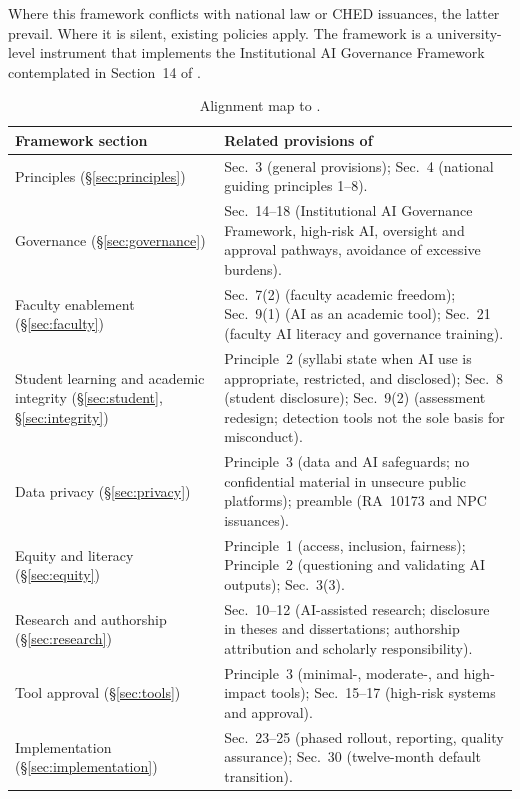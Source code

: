 Where this framework conflicts with national law or CHED issuances, the latter prevail. Where it is silent, existing \vsu{} policies apply. The framework is a university-level instrument that implements the Institutional AI Governance Framework contemplated in Section~14 of \cmo{}.

\begin{table}[ht]
\centering
\caption{Alignment map to \cmo{}.}
\label{tab:alignment}
\small
\begin{tabular}{@{}p{4.2cm}p{10cm}@{}}
\toprule
Framework section & Related provisions of \cmo{} \\
\midrule
Principles (\S\ref{sec:principles}) & Sec.~3 (general provisions); Sec.~4 (national guiding principles 1--8). \\
Governance (\S\ref{sec:governance}) & Sec.~14--18 (Institutional AI Governance Framework, high-risk AI, oversight and approval pathways, avoidance of excessive burdens). \\
Faculty enablement (\S\ref{sec:faculty}) & Sec.~7(2) (faculty academic freedom); Sec.~9(1) (AI as an academic tool); Sec.~21 (faculty AI literacy and governance training). \\
Student learning and academic integrity (\S\ref{sec:student}, \S\ref{sec:integrity}) & Principle~2 (syllabi state when AI use is appropriate, restricted, and disclosed); Sec.~8 (student disclosure); Sec.~9(2) (assessment redesign; detection tools not the sole basis for misconduct). \\
Data privacy (\S\ref{sec:privacy}) & Principle~3 (data and AI safeguards; no confidential material in unsecure public platforms); preamble (RA~10173 and NPC issuances). \\
Equity and literacy (\S\ref{sec:equity}) & Principle~1 (access, inclusion, fairness); Principle~2 (questioning and validating AI outputs); Sec.~3(3). \\
Research and authorship (\S\ref{sec:research}) & Sec.~10--12 (AI-assisted research; disclosure in theses and dissertations; authorship attribution and scholarly responsibility). \\
Tool approval (\S\ref{sec:tools}) & Principle~3 (minimal-, moderate-, and high-impact tools); Sec.~15--17 (high-risk systems and approval). \\
Implementation (\S\ref{sec:implementation}) & Sec.~23--25 (phased rollout, reporting, quality assurance); Sec.~30 (twelve-month default transition). \\
\bottomrule
\end{tabular}
\end{table}

